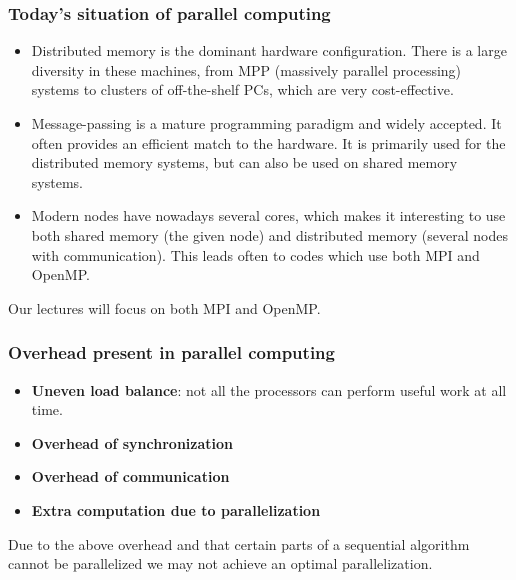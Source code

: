 \documentclass{beamer}
\begin{document}
\begin{frame}
\frametitle{Today's situation of parallel computing}

\begin{block}{}

\begin{itemize}
\item Distributed memory is the dominant hardware configuration. There is a large diversity in these machines, from  MPP (massively parallel processing) systems to clusters of off-the-shelf PCs, which are very cost-effective.

\item Message-passing is a mature programming paradigm and widely accepted. It often provides an efficient match to the hardware. It is primarily used for the distributed memory systems, but can also be used on shared memory systems.

\item Modern nodes have nowadays several cores, which makes it interesting to use both shared memory (the given node) and distributed memory (several nodes with communication). This leads often to codes which use both MPI and OpenMP.
\end{itemize}

\noindent
Our lectures will focus on both MPI and OpenMP.

\end{block}
\end{frame}

\begin{frame}
\frametitle{Overhead present in parallel computing}

\begin{block}{}

\begin{itemize}
\item \textbf{Uneven load balance}:  not all the processors can perform useful work at all time.

\item \textbf{Overhead of synchronization}

\item \textbf{Overhead of communication}

\item \textbf{Extra computation due to parallelization}
\end{itemize}

\noindent
Due to the above overhead and that certain parts of a sequential
algorithm cannot be parallelized we may not achieve an optimal parallelization.
\end{block}
\end{frame}
\end{document}

